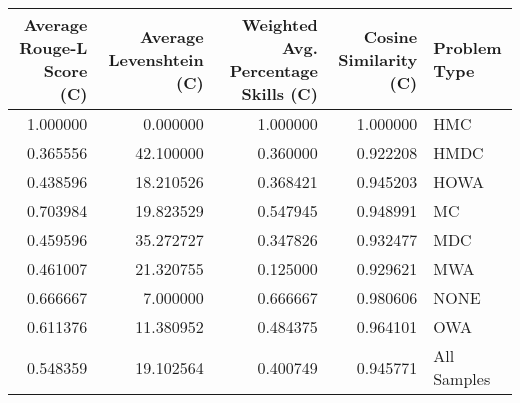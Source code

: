 \begin{tabular}{rrrrl}
\toprule
Average Rouge-L Score (C) & Average Levenshtein (C) & Weighted Avg. Percentage Skills (C) & Cosine Similarity (C) & Problem Type \\
\midrule
1.000000 & 0.000000 & 1.000000 & 1.000000 & HMC \\
0.365556 & 42.100000 & 0.360000 & 0.922208 & HMDC \\
0.438596 & 18.210526 & 0.368421 & 0.945203 & HOWA \\
0.703984 & 19.823529 & 0.547945 & 0.948991 & MC \\
0.459596 & 35.272727 & 0.347826 & 0.932477 & MDC \\
0.461007 & 21.320755 & 0.125000 & 0.929621 & MWA \\
0.666667 & 7.000000 & 0.666667 & 0.980606 & NONE \\
0.611376 & 11.380952 & 0.484375 & 0.964101 & OWA \\
0.548359 & 19.102564 & 0.400749 & 0.945771 & All Samples \\
\bottomrule
\end{tabular}
